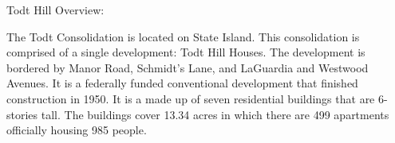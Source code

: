 Todt Hill Overview:       

     

The Todt Consolidation is located on State Island. This consolidation is comprised of a single development: Todt Hill Houses. The development is bordered by Manor Road, Schmidt's Lane, and LaGuardia and Westwood Avenues. It is a federally funded conventional development that finished construction in 1950. It is a made up of seven residential buildings that are 6- stories tall. The buildings cover 13.34 acres in which there are 499 apartments officially housing 985 people.